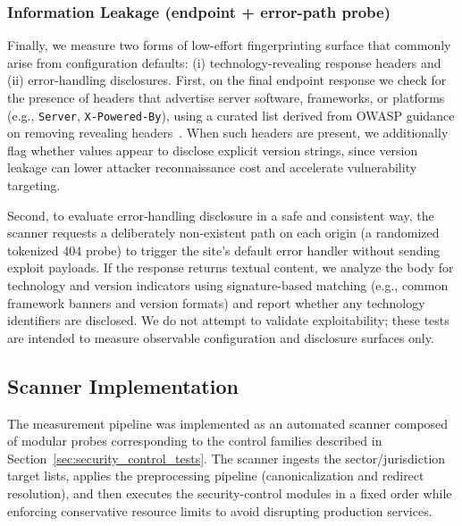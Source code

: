\documentclass[a4paper,fleqn]{cas-sc}
\begin{document}
\subsubsection{Information Leakage (endpoint + error-path probe)}\label{sec:info_leakage}
    Finally, we measure two forms of low-effort fingerprinting surface that commonly arise from configuration defaults: (i) technology-revealing response headers and (ii) error-handling disclosures. 
    First, on the final endpoint response we check for the presence of headers that advertise server software, frameworks, or platforms (e.g., \texttt{Server}, \texttt{X-Powered-By}), using a curated list derived from OWASP guidance on removing revealing headers~\cite{owasp_secure_headers_project}. 
    When such headers are present, we additionally flag whether values appear to disclose explicit version strings, since version leakage can lower attacker reconnaissance cost and accelerate vulnerability targeting.

    Second, to evaluate error-handling disclosure in a safe and consistent way, the scanner requests a deliberately non-existent path on each origin (a randomized tokenized 404 probe) to trigger the site's default error handler without sending exploit payloads. If the response returns textual content, we analyze the body for technology and version indicators using signature-based matching (e.g., common framework banners and version formats) and report whether any technology identifiers are disclosed. We do not attempt to validate exploitability; these tests are intended to measure observable configuration and disclosure surfaces only.

\subsection{Scanner Implementation}
    The measurement pipeline was implemented as an automated scanner composed of modular probes corresponding to the control families described in Section~\ref{sec:security_control_tests}. 
    The scanner ingests the sector/jurisdiction target lists, applies the preprocessing pipeline (canonicalization and redirect resolution), and then executes the security-control modules in a fixed order while enforcing conservative resource limits to avoid disrupting production services.
\end{document}
